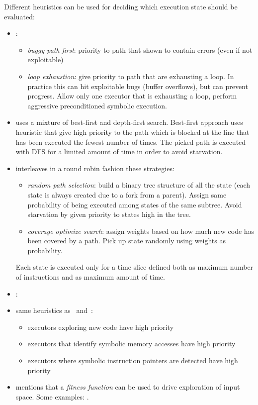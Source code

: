 Different heuristics can be used for deciding which execution state should be evaluated:
\begin{itemize}

  \item \cite{AEG-NDSS11}:
  \begin{itemize}
    \item {\em buggy-path-first}: priority to path that shown to contain errors (even if not exploitable)
    \item {\em loop exhaustion}: give priority to path that are exhausting a loop. In practice this can hit exploitable bugs (buffer overflows), but can prevent progress. Allow only one executor that is exhausting a loop, perform aggressive preconditioned symbolic execution.
  \end{itemize}

  \item \cite{EXE-CCS06} uses a mixture of best-first and depth-first search. Best-first approach uses heuristic that give high priority to the path which is blocked at the line that has been executed the fewest number of times. The picked path is executed with DFS for a limited amount of time in order to avoid starvation. 

  \item \cite{KLEE-OSDI08} interleaves in a round robin fashion these strategies:
  \begin{itemize}
    \item {\em random path selection}: build a binary tree structure of all the state (each state is always created due to a fork from a parent). Assign same probability of being executed among states of the same subtree. Avoid starvation by given priority to states high in the tree.
    \item {\em coverage optimize search}: assign weights based on how much new code has been covered by a path. Pick up state randomly using weights as probability.
  \end{itemize}
  Each state is executed only for a time slice defined both as maximum number of instructions and as maximum amount of time.

  \item \cite{SAGE-NDSS08}:

  \item \cite{MAYHEM-SP12} same heuristics as~\cite{SAGE-NDSS08} and~\cite{KLEE-OSDI08}:
  \begin{itemize}
    \item executors exploring new code have high priority
    \item executors that identify symbolic memory accesses have high priority
    \item executors where symbolic instruction pointers are detected have high priority
  \end{itemize}

  \item \cite{CS-CACM13} mentions that a {\em fitness function} can be used to drive exploration of input space. Some examples: \cite{BHH-ASE11,LMH-JSS10}.

\end{itemize}

